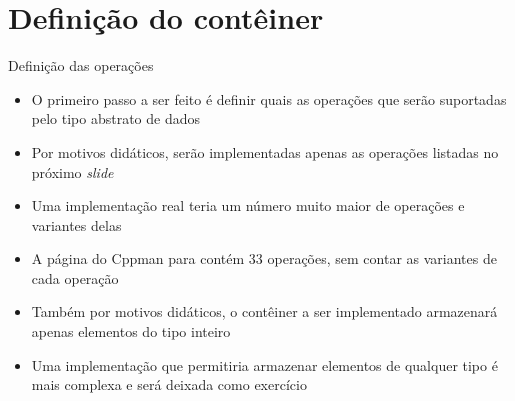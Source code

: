 \section{Definição do contêiner}

\begin{frame}[fragile]{Definição das operações}

    \begin{itemize}
        \item O primeiro passo a ser feito é definir quais as operações que serão suportadas
        pelo tipo abstrato de dados

        \item Por motivos didáticos, serão implementadas apenas as operações listadas no 
        próximo \textit{slide}

        \item Uma implementação real teria um número muito maior de operações e variantes delas

        \item A página do Cppman para  contém 33 operações, sem contar as 
        variantes de cada operação

        \item Também por motivos didáticos, o contêiner a ser implementado armazenará apenas
        elementos do tipo inteiro

        \item Uma implementação que permitiria armazenar elementos de qualquer tipo é mais
        complexa e será deixada como exercício
    \end{itemize}

\end{frame}

